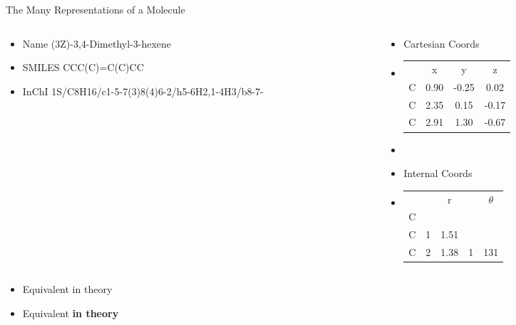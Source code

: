 \documentclass[10pt]{beamer}
\begin{document}
{\begin{frame}{The Many Representations of a Molecule}
\begin{columns}[c]
    \begin{column}{0.3\textwidth}
      \begin{itemize}
		   \item[] {\alert{Name} \mbox{(3Z)-3,4-Dimethyl}-3-hexene}
		   \item[] {\alert{SMILES} CCC(C)=C(C)CC}
		   \item[] {\alert{InChI} 1S/C8H16/c1-5-7(3)8(4)6-2/h5-6H2,1-4H3/b8-7-}
      \end{itemize}
    \end{column}

    \begin{column}{0.45\textwidth}
        \begin{itemize}
      \item[] {\alert{Cartesian Coords}}
      \item[] {
        \begin{tabular}{l c c c}
              &         x    &       y     &      z  \\
          C   &       0.90   &    -0.25    &    0.02 \\
          C   &       2.35   &     0.15    &   -0.17 \\
          C   &       2.91   &     1.30    &   -0.67 \\
        \end{tabular}
        }
          \item[]{}
          \item[] {\alert{Internal Coords}}
          \item[] {
            \begin{tabular}{l c c c c}
              &   &   r  &   &  $\theta$ \\
            C &   &      &   &           \\
            C & 1 & 1.51 &   &           \\
            C & 2 & 1.38 & 1 & 131       \\
            \end{tabular}
          }
          \end{itemize}
    \end{column}
  \end{columns}
  \begin{itemize}
    \item[]<only@2> {Equivalent in theory}
    \item[]<only@3> {Equivalent \alert{\textbf{in theory}}}
  \end{itemize}
\end{frame}


}
\end{document}
